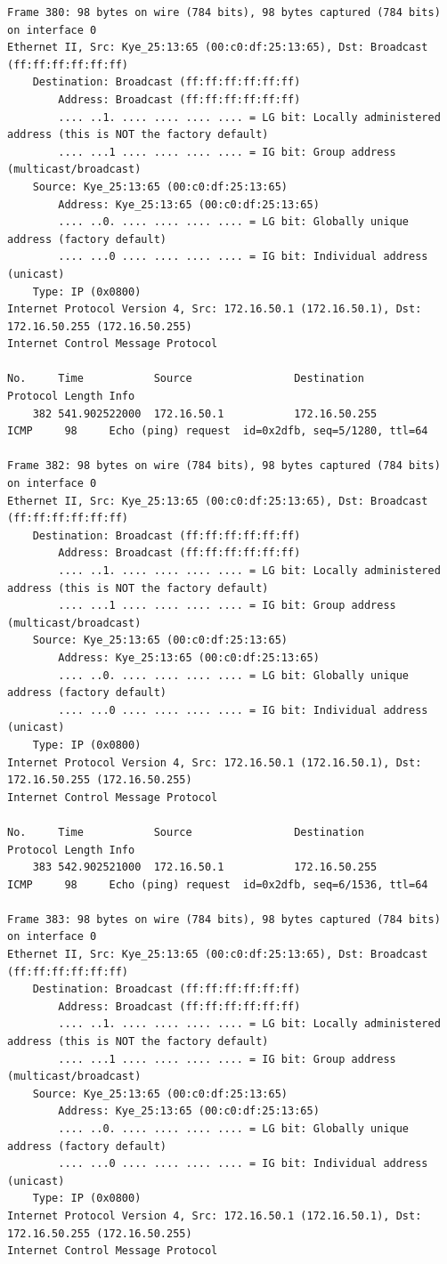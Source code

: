 \documentclass[a4paper,11pt]{article}
\begin{document}
\begin{lstlisting}
Frame 380: 98 bytes on wire (784 bits), 98 bytes captured (784 bits) on interface 0
Ethernet II, Src: Kye_25:13:65 (00:c0:df:25:13:65), Dst: Broadcast (ff:ff:ff:ff:ff:ff)
    Destination: Broadcast (ff:ff:ff:ff:ff:ff)
        Address: Broadcast (ff:ff:ff:ff:ff:ff)
        .... ..1. .... .... .... .... = LG bit: Locally administered address (this is NOT the factory default)
        .... ...1 .... .... .... .... = IG bit: Group address (multicast/broadcast)
    Source: Kye_25:13:65 (00:c0:df:25:13:65)
        Address: Kye_25:13:65 (00:c0:df:25:13:65)
        .... ..0. .... .... .... .... = LG bit: Globally unique address (factory default)
        .... ...0 .... .... .... .... = IG bit: Individual address (unicast)
    Type: IP (0x0800)
Internet Protocol Version 4, Src: 172.16.50.1 (172.16.50.1), Dst: 172.16.50.255 (172.16.50.255)
Internet Control Message Protocol

No.     Time           Source                Destination           Protocol Length Info
    382 541.902522000  172.16.50.1           172.16.50.255         ICMP     98     Echo (ping) request  id=0x2dfb, seq=5/1280, ttl=64

Frame 382: 98 bytes on wire (784 bits), 98 bytes captured (784 bits) on interface 0
Ethernet II, Src: Kye_25:13:65 (00:c0:df:25:13:65), Dst: Broadcast (ff:ff:ff:ff:ff:ff)
    Destination: Broadcast (ff:ff:ff:ff:ff:ff)
        Address: Broadcast (ff:ff:ff:ff:ff:ff)
        .... ..1. .... .... .... .... = LG bit: Locally administered address (this is NOT the factory default)
        .... ...1 .... .... .... .... = IG bit: Group address (multicast/broadcast)
    Source: Kye_25:13:65 (00:c0:df:25:13:65)
        Address: Kye_25:13:65 (00:c0:df:25:13:65)
        .... ..0. .... .... .... .... = LG bit: Globally unique address (factory default)
        .... ...0 .... .... .... .... = IG bit: Individual address (unicast)
    Type: IP (0x0800)
Internet Protocol Version 4, Src: 172.16.50.1 (172.16.50.1), Dst: 172.16.50.255 (172.16.50.255)
Internet Control Message Protocol

No.     Time           Source                Destination           Protocol Length Info
    383 542.902521000  172.16.50.1           172.16.50.255         ICMP     98     Echo (ping) request  id=0x2dfb, seq=6/1536, ttl=64

Frame 383: 98 bytes on wire (784 bits), 98 bytes captured (784 bits) on interface 0
Ethernet II, Src: Kye_25:13:65 (00:c0:df:25:13:65), Dst: Broadcast (ff:ff:ff:ff:ff:ff)
    Destination: Broadcast (ff:ff:ff:ff:ff:ff)
        Address: Broadcast (ff:ff:ff:ff:ff:ff)
        .... ..1. .... .... .... .... = LG bit: Locally administered address (this is NOT the factory default)
        .... ...1 .... .... .... .... = IG bit: Group address (multicast/broadcast)
    Source: Kye_25:13:65 (00:c0:df:25:13:65)
        Address: Kye_25:13:65 (00:c0:df:25:13:65)
        .... ..0. .... .... .... .... = LG bit: Globally unique address (factory default)
        .... ...0 .... .... .... .... = IG bit: Individual address (unicast)
    Type: IP (0x0800)
Internet Protocol Version 4, Src: 172.16.50.1 (172.16.50.1), Dst: 172.16.50.255 (172.16.50.255)
Internet Control Message Protocol


\end{lstlisting}
\end{document}
